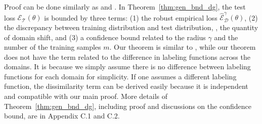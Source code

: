 Proof can be done similarly as \cite{ben2010theory} and \cite{norton2019diametrical}.
In Theorem~\ref{thm:gen_bnd_dg}, the test loss $\mathcal{E}_{\mathcal{T}}(\theta)$ is bounded by three terms: (1) the robust empirical loss $\hat{\mathcal{E}}_{\mathcal{D}}^{\gamma}(\theta)$, (2) the discrepancy between training distribution and test distribution, \ie, the quantity of domain shift, and (3) a confidence bound related to the radius $\gamma$ and the number of the training samples $m$.
Our theorem is similar to \citet{ben2010theory}, while our theorem does not have the term related to the difference in labeling functions across the domains. It is because we simply assume there is no difference between labeling functions for each domain for simplicity. If one assumes a different labeling function, the dissimilarity term can be derived easily because it is independent and compatible with our main proof.
More details of Theorem~\ref{thm:gen_bnd_dg}, including proof and discussions on the confidence bound, are in Appendix C.1 and C.2.

